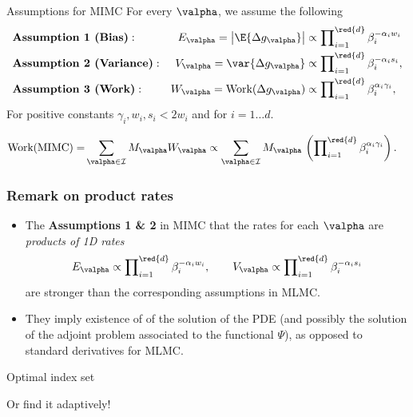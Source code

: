 \begin{frame}{Assumptions for MIMC}
For every $\valpha$, we assume the following
\begin{align*}
  &\textbf{Assumption 1 (Bias)}: &E_\valpha =\left|\E{\Delta
      g_\valpha}\right| &\propto \prod\nolimits_{i=1}^{\red{d}}
  \beta_i^{-\alpha_i w_i}\\
  &\textbf{Assumption 2 (Variance)}:& V_\valpha =\var{\Delta
    g_\valpha} &\propto \prod\nolimits_{i=1}^{\red{d}} \beta_i^{-\alpha_i s_i},\\
  &\textbf{Assumption 3 (Work)}: &W_\valpha = \text{Work}( \Delta
  g_\valpha) &\propto \prod\nolimits_{i=1}^{\red{d}}
  \beta_{i}^{\alpha_i \gamma_i} ,
\end{align*}
For positive constants $\gamma_i, w_i, s_i < 2w_i$ and for $i = 1
\ldots d$.

    \begin{align*}
      \text{Work}({\text{MIMC}}) =& \sum_{\valpha \in \mathcal I}
      {M_\valpha} W_{\valpha} \propto \sum_{\valpha\in\mathcal I}
      {M_\valpha} \, \left( \prod\nolimits_{i=1}^{\red{d}} \beta_{i}^{\alpha_i
          \gamma_i} \right).
    \end{align*}

\end{frame}

\begin{frame}\frametitle{Remark on product rates}

\begin{itemize}
\item The {\bf Assumptions 1 \& 2} in MIMC that the rates for each $\valpha$ are \emph{products of 1D rates}
\[
  E_\valpha \propto \prod\nolimits_{i=1}^{\red{d}}
  \beta_i^{-\alpha_i w_i}, \qquad V_\valpha \propto \prod\nolimits_{i=1}^{\red{d}} \beta_i^{-\alpha_i s_i}
\]
are stronger than the corresponding assumptions in MLMC.

\item<2-> They imply existence of  of the solution
  of the PDE (and possibly the solution of the adjoint problem
  associated to the functional $\Psi$), as opposed to standard
  derivatives for MLMC.
\end{itemize}

\end{frame}

\begin{frame}{Optimal index set}
  \begin{minipage}[m]{0.7\linewidth}
    \begin{center}
      \def\svgwidth{7cm} 
    \end{center}
  \end{minipage}
  \hspace{0.375cm}
  \begin{minipage}[m]{0.2\linewidth}
    Or find it adaptively!
  \end{minipage}
\end{frame}

